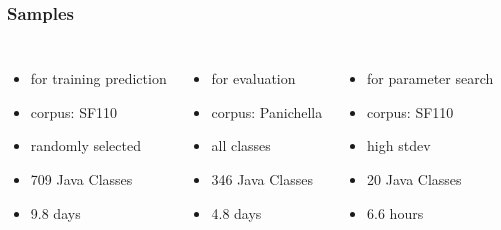 \begin{frame}
	\frametitle{Samples}
	
	\begin{columns}[c]
	
	\begin{itemize}
		\item for training prediction
		\item corpus: SF110
		\item randomly selected
		\item 709 Java Classes
		\item 9.8 days
	\end{itemize}
	
	\begin{itemize}
		\item for evaluation
		\item corpus: Panichella
		\item all classes
		\item 346 Java Classes
		\item 4.8 days
	\end{itemize}
	
	\begin{itemize}
		\item for parameter search
		\item corpus: SF110
		\item high stdev
		\item 20 Java Classes
		\item 6.6 hours
	\end{itemize}
	
	\end{columns}
	
\end{frame}



